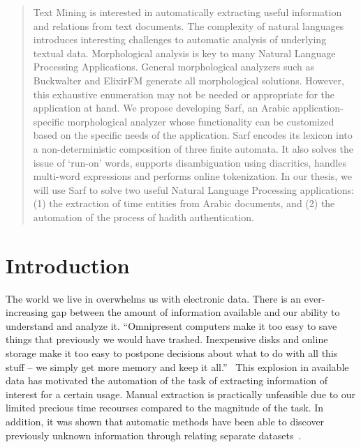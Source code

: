 \documentclass[a4,12pt]{report}
\begin{document}
\begin{abstract}
Text Mining 
is interested in automatically extracting useful information and relations from text documents.
The complexity of natural languages introduces interesting challenges 
to automatic analysis of underlying textual data.
Morphological analysis is key to many Natural Language Processing Applications.
General morphological analyzers such as Buckwalter and ElixirFM 
generate all morphological solutions.
However, this exhaustive enumeration may not be needed or appropriate for the
application at hand.
We propose developing Sarf, an Arabic application-specific morphological analyzer whose functionality can be customized 
based on the specific needs of the application. 
Sarf encodes its lexicon into a non-deterministic composition of three finite automata.
It also solves the issue of `run-on' words, supports disambiguation using diacritics, 
handles multi-word expressions and performs online tokenization.
In our thesis, we will use Sarf to solve two useful Natural Language Processing applications: 
(1) the extraction of time entities from Arabic documents, and 
(2) the automation of the process of hadith authentication.

\end{abstract}

\chapter{Introduction}
\label{s:intro}

The world we live in overwhelms us with electronic data. There is an ever-increasing gap between the amount
of information available and our ability to understand and analyze it. ``Omnipresent computers make
it too easy to save things that previously we would have trashed. Inexpensive disks
and online storage make it too easy to postpone decisions about what to do with all
this stuff -- we simply get more memory and keep it all.''~\cite{Witten:11}
This explosion in available data has motivated the automation of the task 
of extracting information of interest for a certain usage. 
Manual extraction is practically unfeasible due to
our limited precious time recourses compared to the magnitude of the task.
In addition, it was shown that automatic methods have been able to discover previously unknown 
information through relating separate datasets~\cite{JNi06}.
\end{document}
